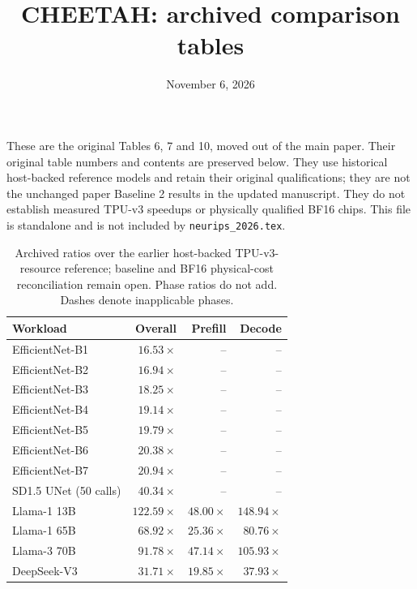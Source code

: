\documentclass{article}
\title{CHEETAH: archived comparison tables}
\date{November 6, 2026}
\begin{document}
\maketitle
These are the original Tables 6, 7 and 10, moved out of the main paper.
Their original table numbers and contents are preserved below. They use
historical host-backed reference models and retain their original qualifications;
they are not the unchanged paper Baseline 2 results in the updated manuscript.
They do not establish measured TPU-v3 speedups or physically qualified BF16 chips.
This file is standalone and is not included by \texttt{neurips\_2026.tex}.

\clearpage
\setcounter{table}{5}
\begin{table}[H]
\centering\small
\caption{Archived ratios over the earlier host-backed TPU-v3-resource reference; baseline and BF16 physical-cost reconciliation remain open. Phase ratios do not add. Dashes denote inapplicable phases.}
\label{tab:uniform_suite_overview}
\begin{tabular}{@{}lrrr@{}}
\toprule
Workload & Overall & Prefill & Decode \\
\midrule
EfficientNet-B1 & $16.53\times$ & -- & -- \\
EfficientNet-B2 & $16.94\times$ & -- & -- \\
EfficientNet-B3 & $18.25\times$ & -- & -- \\
EfficientNet-B4 & $19.14\times$ & -- & -- \\
EfficientNet-B5 & $19.79\times$ & -- & -- \\
EfficientNet-B6 & $20.38\times$ & -- & -- \\
EfficientNet-B7 & $20.94\times$ & -- & -- \\
SD1.5 UNet (50 calls) & $40.34\times$ & -- & -- \\
Llama-1 13B & $122.59\times$ & $48.00\times$ & $148.94\times$ \\
Llama-1 65B & $68.92\times$ & $25.36\times$ & $80.76\times$ \\
Llama-3 70B & $91.78\times$ & $47.14\times$ & $105.93\times$ \\
DeepSeek-V3 & $31.71\times$ & $19.85\times$ & $37.93\times$ \\
\bottomrule
\end{tabular}
\end{table}
\end{document}
